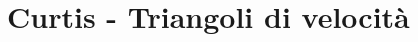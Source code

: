 \documentclass[a4paper, 15pt]{article}
\begin{document}
\newpage
\section{Curtis - Triangoli di velocità}
\newpage
\end{document}
